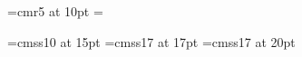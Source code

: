 

\font\doubledtenrm=cmr5 at 10pt
\musicparskip\parindent12mm
\bigaccid
\nopagenumbers %
\headline={\ifnum{}\else \ifodd\pageno\rightheadline \else\leftheadline\fi \fi}
\def\rightheadline{\hfil{\doubledtenrm \part{} / MAHLER---SYMPHONIE IX}\hfil\tenrm\folio}
\def\leftheadline{\tenrm\folio\hfil{\doubledtenrm \part{} / MAHLER---SYMPHONIE IX}\hfil}
\nostartrule
\def\writebarno{\llap{\tentt\the\barno\barnoadd}}%
\def\raisebarno{1.7\Interligne}%
\def\shiftbarno{3.0\internote}%
\def\writezbarno{}%

\font\sansseriffifteen=cmss10 at 15pt
\font\sansserifseventeen=cmss17 at 17pt
\font\sansseriftwenty=cmss17 at 20pt
\def\parttitle#1{
  \centerline{\BIGfont Neunte Symphonie}
  \hbox to \hsize{\boxit{\sansserifseventeen{#1}}\hfill\nobreak{\medtype Gustav Mahler}}%
}
\def\movement#1{
	\centerline{\sansseriftwenty #1}\smallskip
}

